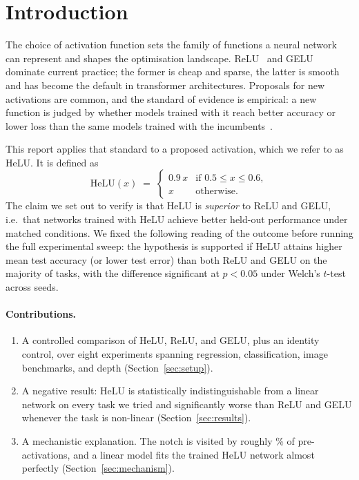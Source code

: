 \documentclass[11pt]{article}
\newcommand{\helu}{\mathrm{HeLU}}
\begin{document}
\section{Introduction}

The choice of activation function sets the family of functions a neural network can represent and shapes
the optimisation landscape. ReLU~\citep{nair2010relu} and GELU~\citep{hendrycks2016gelu} dominate current
practice; the former is cheap and sparse, the latter is smooth and has become the default in transformer
architectures. Proposals for new activations are common, and the standard of evidence is empirical: a new
function is judged by whether models trained with it reach better accuracy or lower loss than the same
models trained with the incumbents~\citep{ramachandran2018swish}.

This report applies that standard to a proposed activation, which we refer to as HeLU. It is defined as
\begin{equation}
  \helu(x) \;=\;
  \begin{cases}
    0.9\,x & \text{if } 0.5 \le x \le 0.6,\\
    x      & \text{otherwise.}
  \end{cases}
  \label{eq:helu}
\end{equation}
The claim we set out to verify is that HeLU is \emph{superior} to ReLU and GELU, i.e.\ that networks
trained with HeLU achieve better held-out performance under matched conditions. We fixed the
following reading of the outcome before running the full experimental sweep: the hypothesis is supported if HeLU
attains higher mean test accuracy (or lower test error) than both ReLU and GELU on the majority of tasks,
with the difference significant at $p<0.05$ under Welch's $t$-test~\citep{welch1947} across seeds.

\paragraph{Contributions.}
\begin{enumerate}[nosep]
  \item A controlled comparison of HeLU, ReLU, and GELU, plus an identity control, over eight experiments
        spanning regression, classification, image benchmarks, and depth (Section~\ref{sec:setup}).
  \item A negative result: HeLU is statistically indistinguishable from a linear network on every task
        we tried and significantly worse than ReLU and GELU whenever the task is non-linear
        (Section~\ref{sec:results}).
  \item A mechanistic explanation. The notch is visited by roughly \notchHelu\% of pre-activations, and
        a linear model fits the trained HeLU network almost perfectly (Section~\ref{sec:mechanism}).
\end{enumerate}
\end{document}
